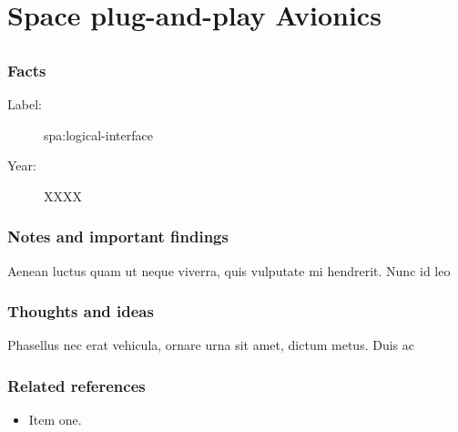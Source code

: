 \chapter{Space plug-and-play Avionics}

\section{}

\subsection{Facts}
\begin{description}
    \item[Label:] spa:logical-interface \cite{spa:logical-interface}
    \item[Year:] XXXX
\end{description}

\subsection{Notes and important findings}
Aenean luctus quam ut neque viverra, quis vulputate mi hendrerit. Nunc id leo

\subsection{Thoughts and ideas}
Phasellus nec erat vehicula, ornare urna sit amet, dictum metus. Duis ac

\subsection{Related references}
\begin{itemize}
    \item Item one.
\end{itemize}
